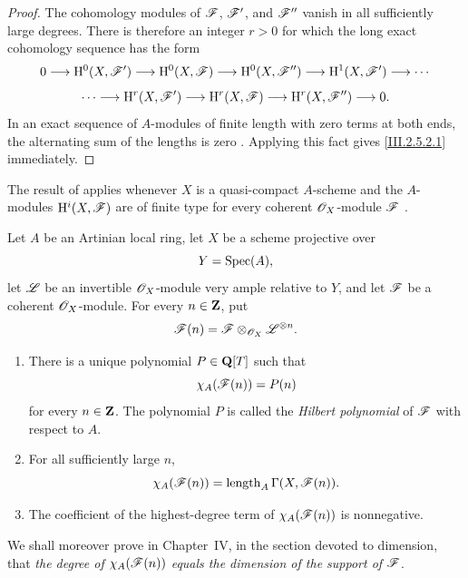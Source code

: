 \begin{proof}
The cohomology modules of $\mathscr{F}$, $\mathscr{F}'$, and $\mathscr{F}''$ vanish in all sufficiently large degrees.
There is therefore an integer $r>0$ for which the long exact cohomology sequence has the form
\[
  0\longrightarrow\mathrm{H}^0(X,\mathscr{F}')
  \longrightarrow\mathrm{H}^0(X,\mathscr{F})
  \longrightarrow\mathrm{H}^0(X,\mathscr{F}'')
  \longrightarrow\mathrm{H}^1(X,\mathscr{F}')
  \longrightarrow\cdots
\]
\[
  \cdots\longrightarrow\mathrm{H}^r(X,\mathscr{F}')
  \longrightarrow\mathrm{H}^r(X,\mathscr{F})
  \longrightarrow\mathrm{H}^r(X,\mathscr{F}'')
  \longrightarrow0.
\]
In an exact sequence of $A$-modules of finite length with zero terms at both ends, the alternating sum of the lengths is zero .
Applying this fact gives \eqref{III.2.5.2.1} immediately.
\end{proof}

The result of  applies whenever $X$ is a quasi-compact $A$-scheme and the $A$-modules $\mathrm{H}^i(X,\mathscr{F})$ are of finite type for every coherent $\mathscr{O}_X$-module $\mathscr{F}$ .

\begin{theorem}[2.5.3]
\label{III.2.5.3}
Let $A$ be an Artinian local ring, let $X$ be a scheme projective over
\[
  Y=\operatorname{Spec}(A),
\]
let $\mathscr{L}$ be an invertible $\mathscr{O}_X$-module very ample relative to $Y$, and let $\mathscr{F}$ be a coherent $\mathscr{O}_X$-module.
For every $n\in\mathbf{Z}$, put
\[
  \mathscr{F}(n)=\mathscr{F}\otimes_{\mathscr{O}_X}\mathscr{L}^{\otimes n}.
\]
\begin{enumerate}
  \item[(i)] There is a unique polynomial $P\in\mathbf{Q}[T]$ such that
  \[
    \chi_A(\mathscr{F}(n))=P(n)
  \]
  for every $n\in\mathbf{Z}$.
  The polynomial $P$ is called the \emph{Hilbert polynomial} of $\mathscr{F}$ with respect to $A$.

  \item[(ii)] For all sufficiently large $n$,
  \[
    \chi_A(\mathscr{F}(n))
    =
    \operatorname{length}_A\Gamma(X,\mathscr{F}(n)).
  \]

  \item[(iii)] The coefficient of the highest-degree term of $\chi_A(\mathscr{F}(n))$ is nonnegative.
\end{enumerate}
\end{theorem}

We shall moreover prove in Chapter~IV, in the section devoted to dimension, that \emph{the degree of $\chi_A(\mathscr{F}(n))$ equals the dimension of the support of $\mathscr{F}$}.


